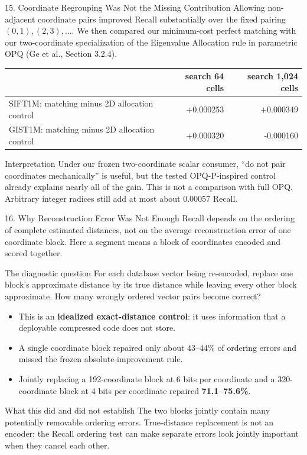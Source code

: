 \documentclass[aspectratio=169]{beamer}
\newcommand{\good}[1]{\textcolor{green!45!black}{\textbf{#1}}}
\begin{document}
\begin{frame}{15. Coordinate Regrouping Was Not the Missing Contribution}
\small
Allowing non-adjacent coordinate pairs improved Recall substantially over the
fixed pairing \((0,1),(2,3),\ldots\).  We then compared our minimum-cost
perfect matching with our two-coordinate specialization of the Eigenvalue
Allocation rule in parametric OPQ (Ge et al., Section 3.2.4).
\begin{center}
\begin{tabular}{lrr}
\toprule
& search 64 cells & search 1,024 cells\\
\midrule
SIFT1M: matching minus 2D allocation control & +0.000253 & +0.000349\\
GIST1M: matching minus 2D allocation control & +0.000320 & -0.000160\\
\bottomrule
\end{tabular}
\end{center}
\begin{alertblock}{Interpretation}
Under our frozen two-coordinate scalar consumer, ``do not pair coordinates
mechanically'' is useful, but the tested OPQ-P-inspired control already
explains nearly all of the gain.  This is not a comparison with full OPQ.
Arbitrary integer radices still add at most about 0.00057 Recall.
\end{alertblock}
\end{frame}

\begin{frame}{16. Why Reconstruction Error Was Not Enough}
\footnotesize
Recall depends on the ordering of complete estimated distances, not on the
average reconstruction error of one coordinate block.  Here a segment means
a block of coordinates encoded and scored together.
\begin{block}{The diagnostic question}
For each database vector being re-encoded, replace one block's approximate
distance by its true distance while leaving every other block approximate.
How many wrongly ordered vector pairs become correct?
\end{block}
\begin{itemize}
  \item This is an \textbf{idealized exact-distance control}: it uses
  information that a deployable compressed code does not store.
  \item A single coordinate block repaired only about 43--44\% of ordering errors and missed
  the frozen absolute-improvement rule.
  \item Jointly replacing a 192-coordinate block at 6 bits per coordinate and
  a 320-coordinate block at 4 bits per coordinate repaired \good{71.1--75.6\%}.
\end{itemize}
\begin{alertblock}{What this did and did not establish}
The two blocks jointly contain many potentially removable ordering errors.
True-distance replacement is not an encoder; the Recall ordering test can make
separate errors look jointly important when they cancel each other.
\end{alertblock}
\end{frame}
\end{document}
